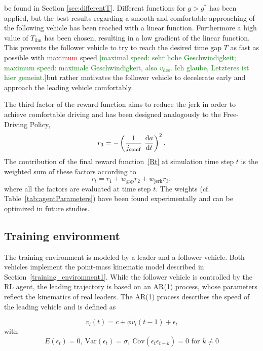 \documentclass[review]{elsarticle}
\providecommand{\red}[1]{\textcolor{red}{#1}}
\providecommand{\green}[1]{\textcolor{green}{#1}}
\providecommand{\martin}[1]{\red{#1}} %
\providecommand{\martinc}[1]{\green{[#1]}} %
\providecommand{\sub}[1]{_{\mathrm{#1}}}  %
\providecommand{\3}{{\ss}}
\begin{document}
be found in Section \ref{sec:differentT}. Different functions for $g
> g^*$ has been applied, but the best results regarding a smooth and
comfortable approaching of the following vehicle has been reached with
a linear function. Furthermore a high value of $T\sub{lim}$ has been
chosen, resulting in a low gradient of the linear function. This
prevents the follower vehicle to try to reach the desired time gap $T$
as fast as possible with \martin{maximum} speed \martinc{maximal
  speed: sehr hohe Geschwindigkeit; maximum speed: maximale
  Geschwindigkeit, also $v\sub{des}$. Ich glaube, Letzteres ist hier gemeint.}but rather motivates the follower vehicle to decelerate early and approach the leading vehicle comfortably.



The third factor of the reward function aims to reduce the jerk in
order to achieve comfortable driving and has been designed analogously to the Free-Driving Policy, 
\begin{equation}
\label{eq:r3_CFP}
r_3 = -\left(\frac{1}{j\sub{comf}} \ \dv{a}{t}\right)^2.
\end{equation}
%
The contribution of the final reward function~\eqref{Rt}  at simulation time step $t$ is the weighted
sum of these factors according to
\begin{equation}
\label{rt2}
r_t = r_1 + w\sub{gap}r_2+w\sub{jerk}r_3,
\end{equation}
where all the factors are evaluated at time step $t$. The weights (cf.
Table~\ref{tab:agentParameters}) have been found experimentally and
can be optimized in future studies.




\subsection{Training environment}
The training environment is modeled by a leader and a follower vehicle. Both vehicles implement the point-mass kinematic model described in Section~\ref{training_environment1}. While the follower vehicle is controlled by the RL agent, the  leading trajectory is based on an AR(1) process, whose parameters
reflect the kinematics of real leaders. The AR(1) process describes
the speed of the leading vehicle and is defined as 

\begin{equation} \label{eq:AR1}
v_l(t) = c+\phi v_l(t-1)+ \epsilon_t
\end{equation}
with
\begin{equation}
E(\epsilon_t) = 0, \ \text{Var}(\epsilon_t) = \sigma, \ 
\text{Cov}(\epsilon_t\epsilon_{t+k})=0 \text{ for }k\neq 0
\end{equation}
\end{document}
